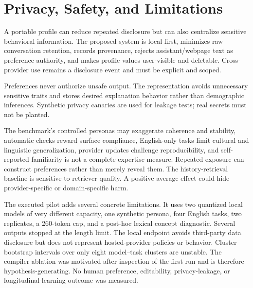 \section{Privacy, Safety, and Limitations}
\label{sec:limitations}

A portable profile can reduce repeated disclosure but can also centralize
sensitive behavioral information. The proposed system is local-first, minimizes
raw conversation retention, records provenance, rejects assistant/webpage text as
preference authority, and makes profile values user-visible and deletable.
Cross-provider use remains a disclosure event and must be explicit and scoped.

Preferences never authorize unsafe output. The representation avoids unnecessary
sensitive traits and stores desired explanation behavior rather than demographic
inferences. Synthetic privacy canaries are used for leakage tests; real secrets
must not be planted.

The benchmark's controlled personas may exaggerate coherence and stability,
automatic checks reward surface compliance, English-only tasks limit cultural and
linguistic generalization, provider updates challenge reproducibility, and
self-reported familiarity is not a complete expertise measure. Repeated exposure
can construct preferences rather than merely reveal them. The history-retrieval
baseline is sensitive to retriever quality. A positive average effect could hide
provider-specific or domain-specific harm.

The executed pilot adds several concrete limitations. It uses two quantized local
models of very different capacity, one synthetic persona, four English tasks, two
replicates, a 260-token cap, and a post-hoc lexical concept diagnostic. Several
outputs stopped at the length limit. The local endpoint avoids third-party data
disclosure but does not represent hosted-provider policies or behavior. Cluster
bootstrap intervals over only eight model--task clusters are unstable. The
compiler ablation was motivated after inspection of the first run and is therefore
hypothesis-generating. No human preference, editability, privacy-leakage, or
longitudinal-learning outcome was measured.

